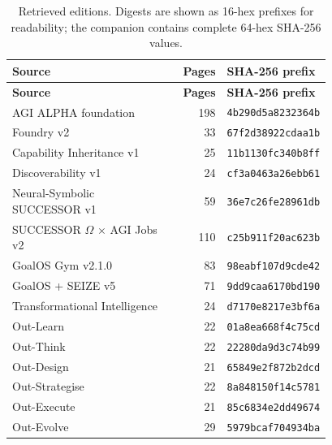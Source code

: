 \documentclass[11pt]{article}
\begin{document}
\begingroup
\small

\begin{longtable}{P{0.50\linewidth}rP{0.28\linewidth}}
\caption{Retrieved editions. Digests are shown as 16-hex prefixes for readability; the companion contains complete 64-hex SHA-256 values.}\\
\toprule
\textbf{Source} & \textbf{Pages} & \textbf{SHA-256 prefix}\\
\midrule
\endfirsthead
\toprule
\textbf{Source} & \textbf{Pages} & \textbf{SHA-256 prefix}\\
\midrule
\endhead
AGI ALPHA foundation & 198 & \texttt{4b290d5a8232364b}\\
Foundry v2 & 33 & \texttt{67f2d38922cdaa1b}\\
Capability Inheritance v1 & 25 & \texttt{11b1130fc340b8ff}\\
Discoverability v1 & 24 & \texttt{cf3a0463a26ebb61}\\
Neural-Symbolic SUCCESSOR v1 & 59 & \texttt{36e7c26fe28961db}\\
SUCCESSOR $\Omega$ $\times$ AGI Jobs v2 & 110 & \texttt{c25b911f20ac623b}\\
GoalOS Gym v2.1.0 & 83 & \texttt{98eabf107d9cde42}\\
GoalOS + SEIZE v5 & 71 & \texttt{9dd9caa6170bd190}\\
Transformational Intelligence & 24 & \texttt{d7170e8217e3bf6a}\\
Out-Learn & 22 & \texttt{01a8ea668f4c75cd}\\
Out-Think & 22 & \texttt{22280da9d3c74b99}\\
Out-Design & 21 & \texttt{65849e2f872b2dcd}\\
Out-Strategise & 22 & \texttt{8a848150f14c5781}\\
Out-Execute & 21 & \texttt{85c6834e2dd49674}\\
Out-Evolve & 29 & \texttt{5979bcaf704934ba}\\
\bottomrule
\end{longtable}


\endgroup

\end{document}

